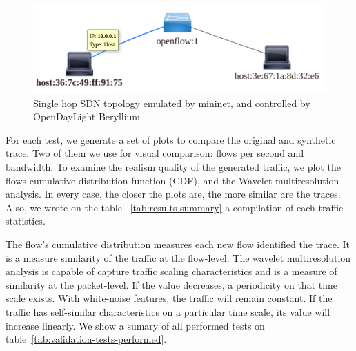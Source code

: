 \begin{figure}[!ht]
    \centering
    \includegraphics[scale=0.4]{figures/ch5/topo-simple}
    \caption{Single hop SDN topology emulated by mininet, and controlled by OpenDayLight Beryllium}
    \label{fig:topo-simple}
\end{figure}


For each test, we generate a set of plots to compare the original and synthetic trace. Two of them we use for visual comparison: flows per second and bandwidth. To examine the realism quality of the generated traffic, we plot the flows cumulative distribution function (CDF)\cite{harpoon-paper}, and the Wavelet multiresolution analysis.  In every case, the closer the plots are, the more similar are the traces. Also, we wrote on the table ~\ref{tab:results-summary} a compilation of each traffic statistics. 

The flow's cumulative distribution measures each new flow identified the trace. It is a measure similarity of the traffic at the flow-level.  The wavelet multiresolution analysis is capable of capture traffic scaling characteristics and is a measure of similarity at the packet-level. If the value decreases, a periodicity on that time scale exists. With white-noise features, the traffic will remain constant. If the traffic has self-similar characteristics on a particular time scale, its value will increase linearly. We show a sumary of all performed tests on table~\ref{tab:validation-tests-performed}.


